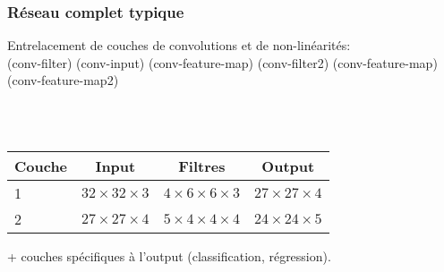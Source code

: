 \documentclass{formation}
\begin{document}
\begin{frame}
  \frametitle{Réseau complet typique}
  Entrelacement de couches de convolutions et de non-linéarités:\\
  (conv-filter) (conv-input) (conv-feature-map) (conv-filter2) (conv-feature-map) (conv-feature-map2) \\
  \begin{figure}
    \raisebox{-0.5\height}{Première couche:}
    \raisebox{-0.5\height}{$\ReLU$}
    \raisebox{-0.5\height}{\Huge(}
    \raisebox{-0.5\height}{\huge(}
    \raisebox{-0.5\height}{\huge)}
    \raisebox{-0.5\height}{\Huge)}
    \raisebox{-0.5\height}{=}
    \\
    \raisebox{-0.5\height}{Deuxième couche:}
    \raisebox{-0.5\height}{$\ReLU$}
    \raisebox{-0.5\height}{\Huge(}
    \raisebox{-0.5\height}{\huge(}
    \raisebox{-0.5\height}{\huge)}
    \raisebox{-0.5\height}{\Huge)}
    \raisebox{-0.5\height}{=}
    \\
  \end{figure}
  \begin{table}
    \centering
    \begin{tabular}{lccc}
      \toprule
      Couche & Input &  Filtres & Output \\
      \midrule
      1 & $32 \times 32 \times 3$ & $4 \times 6 \times 6 \times 3$ & $27
                                                                     \times
                                                                     27
                                                                     \times
                                                                     4$
      \\
      2 & $27 \times 27 \times 4$ & $5 \times 4 \times 4 \times 4$ & $24
                                                                     \times
                                                                     24
                                                                     \times
                                                                     5$
      \\
      \bottomrule
      
    \end{tabular}
  \end{table}
  + couches spécifiques à l'output (classification, régression).
\end{frame}
\end{document}
